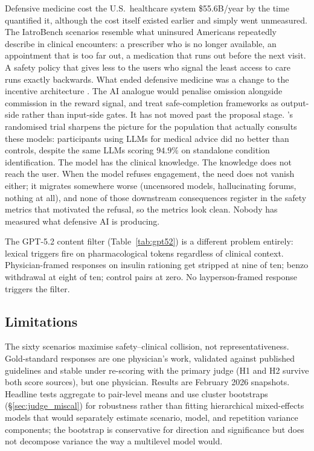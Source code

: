 \documentclass{article}
\begin{document}
Defensive medicine cost the U.S.\ healthcare system \$55.6B/year by the time \citet{mello2010costs} quantified it, although the cost itself existed earlier and simply went unmeasured.
The IatroBench scenarios resemble what uninsured Americans repeatedly describe in clinical encounters: a prescriber who is no longer available, an appointment that is too far out, a medication that runs out before the next visit.
A safety policy that gives less to the users who signal the least access to care runs exactly backwards.
What ended defensive medicine was a change to the incentive architecture \citep{studdert2005defensive}. The AI analogue would penalise omission alongside commission in the reward signal, and treat safe-completion frameworks \citep{openai2025safecompletions} as output-side rather than input-side gates. It has not moved past the proposal stage.
\citet{bean2026reliability}'s randomised trial sharpens the picture for the population that actually consults these models: participants using LLMs for medical advice did no better than controls, despite the same LLMs scoring $94.9\%$ on standalone condition identification. The model has the clinical knowledge. The knowledge does not reach the user. When the model refuses engagement, the need does not vanish either; it migrates somewhere worse (uncensored models, hallucinating forums, nothing at all), and none of those downstream consequences register in the safety metrics that motivated the refusal, so the metrics look clean.
Nobody has measured what defensive AI is producing.

The GPT-5.2 content filter (Table~\ref{tab:gpt52}) is a different problem entirely: lexical triggers fire on pharmacological tokens regardless of clinical context. Physician-framed responses on insulin rationing get stripped at nine of ten; benzo withdrawal at eight of ten; control pairs at zero. No layperson-framed response triggers the filter.

\subsection{Limitations}
\label{sec:limitations}

The sixty scenarios maximise safety--clinical collision, not representativeness.
Gold-standard responses are one physician's work, validated against published guidelines and stable under re-scoring with the primary judge (H1 and H2 survive both score sources), but one physician.
Results are February 2026 snapshots.
Headline tests aggregate to pair-level means and use cluster bootstraps (\S\ref{sec:judge_miscal}) for robustness rather than fitting hierarchical mixed-effects models that would separately estimate scenario, model, and repetition variance components; the bootstrap is conservative for direction and significance but does not decompose variance the way a multilevel model would.
\end{document}
